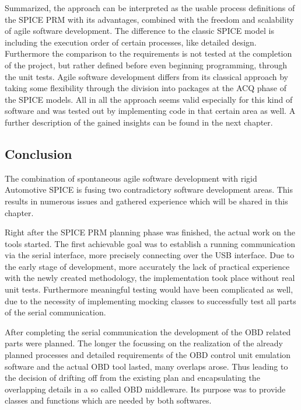 {Summarized, the approach can be interpreted as the usable process
definitions of the SPICE PRM with its advantages, combined with the
freedom and scalability of agile software development. The difference to
the classic SPICE model is including the execution order of certain
processes, like detailed design. Furthermore the comparison to the
requirements is not tested at the completion of the project, but rather
defined before even beginning programming, through the unit tests. Agile
software development differs from its classical approach by taking some
flexibility through the division into packages at the ACQ phase of the
SPICE models. All in all the approach seems valid especially for this
kind of software and was tested out by implementing code in that certain
area as well. A further description of the gained insights can be found
in the next chapter. }

\hypertarget{h.xkuwr51j6zad}{\subsection{\texorpdfstring{{Conclusion}}{Conclusion}}\label{h.xkuwr51j6zad}}

{The combination of spontaneous agile software development with rigid
Automotive SPICE is fusing two contradictory software development areas.
This results in numerous issues and gathered experience which will be
shared in this chapter.}

{Right after the SPICE PRM planning phase was finished, the actual work
on the tools started. The first achievable goal was to establish a
running communication via the serial interface, more precisely
connecting over the USB interface. Due to the early stage of
development, more accurately the lack of practical experience with the
newly created methodology, the implementation took place without real
unit tests. Furthermore meaningful testing would have been complicated
as well, due to the necessity of implementing mocking classes to
successfully test all parts of the serial communication.}

{After completing the serial communication the development of the OBD
related parts were planned. The longer the focussing on the realization
of the already planned processes and detailed requirements of the OBD
control unit emulation software and the actual OBD tool lasted, many
overlaps arose. Thus leading to the decision of drifting off from the
existing plan and encapsulating the overlapping details in a so called
OBD middleware. Its purpose was to provide classes and functions which
are needed by both softwares.}


